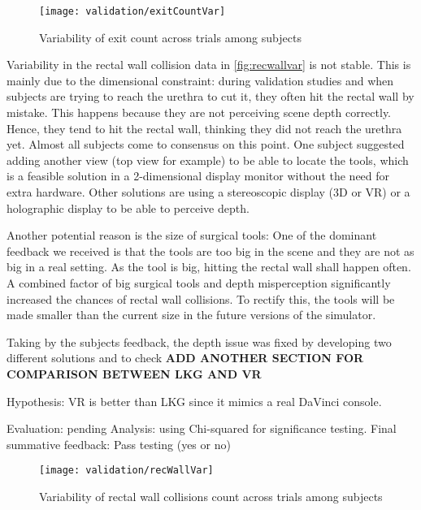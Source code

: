 \begin{figure}
  \centering
  \texttt{[image: validation/exitCountVar]}
  \caption{Variability of exit count across trials among subjects}
  \label{fig:exitvar}
\end{figure}

Variability in the rectal wall collision data in \autoref{fig:recwallvar} is not stable. This is mainly due to the dimensional constraint: during validation studies and when subjects are trying to reach the urethra to cut it, they often hit the rectal wall by mistake. This happens because they are not perceiving scene depth correctly. Hence, they tend to hit the rectal wall, thinking they did not reach the urethra yet. Almost all subjects come to consensus on this point. One subject suggested adding another view (top view for example) to be able to locate the tools, which is a feasible solution in a 2-dimensional display monitor without the need for extra hardware. Other solutions are using a stereoscopic display (3D or VR) or a holographic display to be able to perceive depth.

Another potential reason is the size of surgical tools: One of the dominant feedback we received is that the tools are too big in the scene and they are not as big in a real setting. As the tool is big, hitting the rectal wall shall happen often. A combined factor of big surgical tools and depth misperception significantly increased the chances of rectal wall collisions. To rectify this, the tools will be made smaller than the current size in the future versions of the simulator.

Taking by the subjects feedback, the depth issue was fixed by developing two different solutions and to check                                                                   
\textbf{ADD ANOTHER SECTION FOR COMPARISON BETWEEN LKG AND VR}

Hypothesis: VR is better than LKG since it mimics a real DaVinci console. 

Evaluation: pending
Analysis: using Chi-squared for significance testing. 
Final summative feedback: Pass testing (yes or no) 

\begin{figure}
  \centering
  \texttt{[image: validation/recWallVar]}
  \caption{Variability of rectal wall collisions count across trials among subjects}
  \label{fig:recwallvar}
\end{figure}

